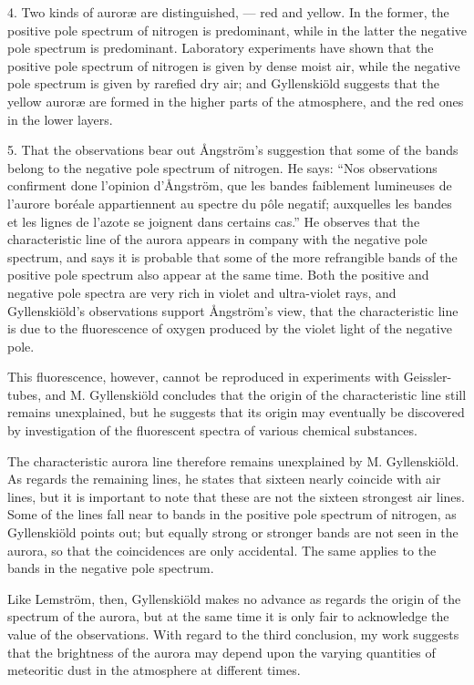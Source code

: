 \documentclass[a4paper, 12pt, oneside, polutonikogreek, english]{article}
\begin{document}
4. Two kinds of auroræ are distinguished, --- red and yellow. In the former, the positive pole spectrum of nitrogen is predominant, while in the latter the negative pole spectrum is predominant. Laboratory experiments have shown that the positive pole spectrum of nitrogen is given by dense moist air, while the negative pole spectrum is given by rarefied dry air; and Gyllenskiöld suggests that the yellow auroræ are formed in the higher parts of the atmosphere, and the red ones in the lower layers.

5. That the observations bear out Ångström's suggestion that some of the bands belong to the negative pole spectrum of nitrogen. He says: ``Nos observations confirment done l'opinion d'Ångström, que les bandes faiblement lumineuses de l'aurore boréale appartiennent au spectre du pôle negatif; auxquelles les bandes et les lignes de l'azote se joignent dans certains cas.'' He observes that the characteristic line of the aurora appears in company with the negative pole spectrum, and says it is probable that some of the more refrangible bands of the positive pole spectrum also appear at the same time. Both the positive and negative pole spectra are very rich in violet and ultra-violet rays, and Gyllenskiöld's observations support Ångström's view, that the characteristic line is due to the fluorescence of oxygen produced by the violet light of the negative pole.

This fluorescence, however, cannot be reproduced in experiments with Geissler-tubes, and M. Gyllenskiöld concludes that the origin of the characteristic line still remains unexplained, but he suggests that its origin may eventually be discovered by investigation of the fluorescent spectra of various chemical substances.

The characteristic aurora line therefore remains unexplained by M. Gyllenskiöld. As regards the remaining lines, he states that sixteen nearly coincide with air lines, but it is important to note that these are not the sixteen strongest air lines. Some of the lines fall near to bands in the positive pole spectrum of nitrogen, as Gyllenskiöld points out; but equally strong or stronger bands are not seen in the aurora, so that the coincidences are only accidental. The same applies to the bands in the negative pole spectrum.

Like Lemström, then, Gyllenskiöld makes no advance as regards the origin of the spectrum of the aurora, but at the same time it is only fair to acknowledge the value of the observations. With regard to the third conclusion, my work suggests that the brightness of the aurora may depend upon the varying quantities of meteoritic dust in the atmosphere at different times.
\end{document}
